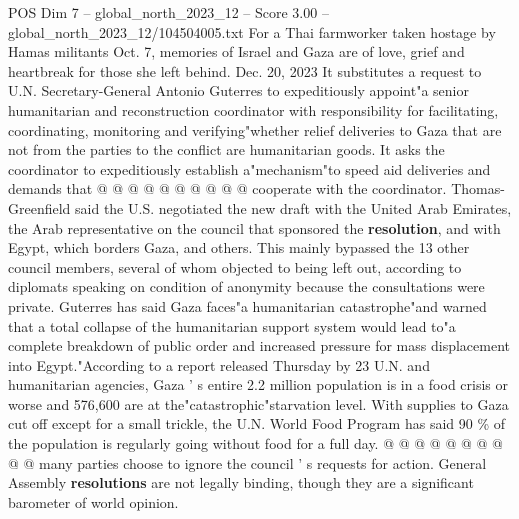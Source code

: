 \begin{textsample}{POS Dim 7 – global\_north\_2023\_12 – Score 3.00 – global\_north\_2023\_12/104504005.txt}
For a Thai farmworker taken hostage by Hamas militants Oct. 7, memories of Israel and Gaza are of love, grief and heartbreak for those she left behind.
Dec. 20, 2023 It substitutes a request to U.N.
Secretary-General Antonio Guterres to expeditiously appoint"a senior humanitarian and reconstruction coordinator with responsibility for facilitating, coordinating, monitoring and verifying"whether relief deliveries to Gaza that are not from the parties to the conflict are humanitarian goods.
It asks the coordinator to expeditiously establish a"mechanism"to speed aid deliveries and demands that @ @ @ @ @ @ @ @ @ @ cooperate with the coordinator.
Thomas-Greenfield said the U.S. negotiated the new draft with the United Arab Emirates, the Arab representative on the council that sponsored the \textbf{resolution}, and with Egypt, which borders Gaza, and others.
This mainly bypassed the 13 other council members, several of whom objected to being left out, according to diplomats speaking on condition of anonymity because the consultations were private.
Guterres has said Gaza faces"a humanitarian catastrophe"and warned that a total collapse of the humanitarian support system would lead to"a complete breakdown of public order and increased pressure for mass displacement into Egypt."According to a report released Thursday by 23 U.N. and humanitarian agencies, Gaza ' s entire 2.2 million population is in a food crisis or worse and 576,600 are at the"catastrophic"starvation level.
With supplies to Gaza cut off except for a small trickle, the U.N.
World Food Program has said 90 \% of the population is regularly going without food for a full day. @ @ @ @ @ @ @ @ @ @ many parties choose to ignore the council ' s requests for action.
General Assembly \textbf{resolutions} are not legally binding, though they are a significant barometer of world opinion.

\end{textsample}
